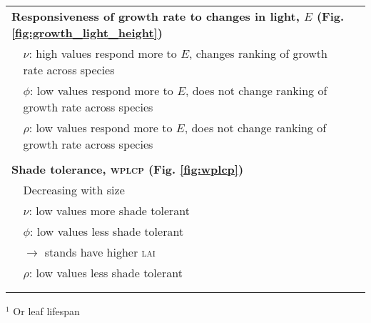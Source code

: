 \documentclass[a4paper,11pt]{article}
\begin{document}
\begin{table}[ht]
{{\begin{tabular}{p{0.1cm}p{9cm}p{6cm}}
  \\ \multicolumn{3}{l}{\bf{Responsiveness of growth rate to changes in light, $E$} (Fig. \ref{fig:growth_light_height})}\\
  & $\nu$: high values respond more to $E$, changes ranking of growth rate across species & \\
  & $\phi$: low values respond more to $E$, does not change ranking of growth rate across species & \\
  & $\rho$: low values respond more to $E$, does not change ranking of growth rate across species & \citet{Ruger-2012}\\

  \\ \multicolumn{3}{l}{\bf{Shade tolerance, \textsc{wplcp}} (Fig. \ref{fig:wplcp})}\\
  & Decreasing with size & \citet{Givnish-1988, Lusk-2008}\\
  & $\nu$: low values more shade tolerant &  \citet{Baltzer-2007}\\
  & $\phi$: low values less shade tolerant & \citet{Poorter-2006, Baltzer-2007, Lusk-2008}\\
  & \quad $\rightarrow$ stands have higher \textsc{lai} &  \citet{Reich-1992, Gower-1993, Niinemets-2010} \\
  & $\rho$: low values less shade tolerant  &  \citet{Osunkoya-1996}\\
  \\ \hline
  \\
  \end{tabular}
  }
$^1$ Or leaf lifespan
}
\label{tab:phenomena}
\end{table}

\newpage
\end{document}
